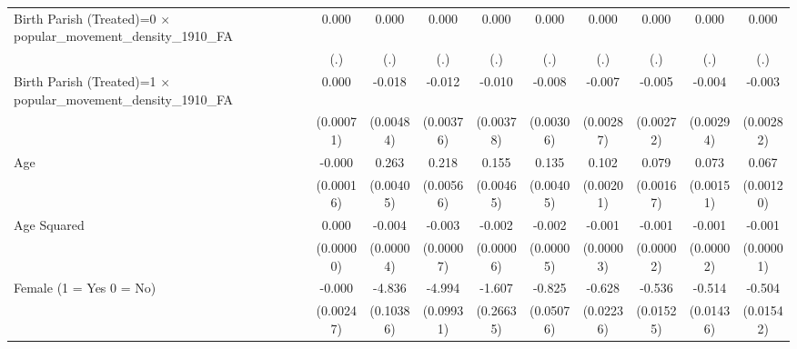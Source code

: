{\begin{tabular}{l*{9}{c}}
Birth Parish (Treated)=0 $\times$ popular\_movement\_density\_1910\_FA&       0.000         &       0.000         &       0.000         &       0.000         &       0.000         &       0.000         &       0.000         &       0.000         &       0.000         \\
                    &         (.)         &         (.)         &         (.)         &         (.)         &         (.)         &         (.)         &         (.)         &         (.)         &         (.)         \\
Birth Parish (Treated)=1 $\times$ popular\_movement\_density\_1910\_FA&       0.000         &      -0.018\sym{***}&      -0.012\sym{**} &      -0.010\sym{*}  &      -0.008\sym{**} &      -0.007\sym{*}  &      -0.005         &      -0.004         &      -0.003         \\
                    &   (0.00071)         &   (0.00484)         &   (0.00376)         &   (0.00378)         &   (0.00306)         &   (0.00287)         &   (0.00272)         &   (0.00294)         &   (0.00282)         \\
Age                 &      -0.000         &       0.263\sym{***}&       0.218\sym{***}&       0.155\sym{***}&       0.135\sym{***}&       0.102\sym{***}&       0.079\sym{***}&       0.073\sym{***}&       0.067\sym{***}\\
                    &   (0.00016)         &   (0.00405)         &   (0.00566)         &   (0.00465)         &   (0.00405)         &   (0.00201)         &   (0.00167)         &   (0.00151)         &   (0.00120)         \\
Age Squared         &       0.000         &      -0.004\sym{***}&      -0.003\sym{***}&      -0.002\sym{***}&      -0.002\sym{***}&      -0.001\sym{***}&      -0.001\sym{***}&      -0.001\sym{***}&      -0.001\sym{***}\\
                    &   (0.00000)         &   (0.00004)         &   (0.00007)         &   (0.00006)         &   (0.00005)         &   (0.00003)         &   (0.00002)         &   (0.00002)         &   (0.00001)         \\
Female (1 = Yes 0 = No)&      -0.000         &      -4.836\sym{***}&      -4.994\sym{***}&      -1.607\sym{***}&      -0.825\sym{***}&      -0.628\sym{***}&      -0.536\sym{***}&      -0.514\sym{***}&      -0.504\sym{***}\\
                    &   (0.00247)         &   (0.10386)         &   (0.09931)         &   (0.26635)         &   (0.05076)         &   (0.02236)         &   (0.01525)         &   (0.01436)         &   (0.01542)         \\

\end{tabular}}
